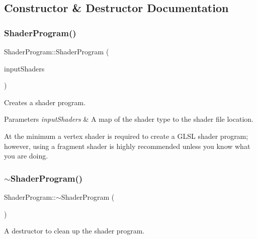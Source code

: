 \subsection{Constructor \& Destructor Documentation}
\hypertarget{class_shader_program_aba2db5734b2f70cc34078126ad279588}{}\label{class_shader_program_aba2db5734b2f70cc34078126ad279588}
\subsubsection{\texorpdfstring{Shader\+Program()}{ShaderProgram()}}
{\footnotesize\ttfamily Shader\+Program\+::\+Shader\+Program (\begin{DoxyParamCaption}\item[{const std\+::unordered\+\_\+map$<$ G\+Lenum, std\+::string $>$ \&}]{input\+Shaders }\end{DoxyParamCaption})}



Creates a shader program.


\begin{DoxyParams}{Parameters}
{\em input\+Shaders} & A map of the shader type to the shader file location.\\
\hline
\end{DoxyParams}
At the minimum a vertex shader is required to create a G\+L\+SL shader program; however, using a fragment shader is highly recommended unless you know what you are doing. \hypertarget{class_shader_program_a2d2eadcfc48cc2e2ddb82aba70553a9f}{}\label{class_shader_program_a2d2eadcfc48cc2e2ddb82aba70553a9f}
\subsubsection{\texorpdfstring{$\sim$\+Shader\+Program()}{~ShaderProgram()}}
{\footnotesize\ttfamily Shader\+Program\+::$\sim$\+Shader\+Program (\begin{DoxyParamCaption}{ }\end{DoxyParamCaption})\hspace{0.3cm}{\ttfamily [virtual]}}



A destructor to clean up the shader program.



